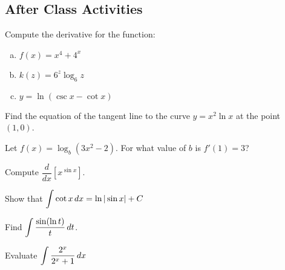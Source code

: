 \documentclass[notes]{subfiles}
\begin{document}
		\begin{pf}
		\end{pf}
		\newpage
		
	\subsection*{After Class Activities}
		\begin{ex}
			Compute the derivative for the function:
			\begin{enumerate}[(a)]
				\item $f(x) =x^4 + 4^x$
					
				\item $k(z) = 6^z\log_6z$
					
				\item $y = \ln (\csc x - \cot x)$
			\end{enumerate}
		\end{ex}
		
		\begin{ex}
			Find the equation of the tangent line to the curve $y = x^2\ln x$ at the point $(1,0)$.
		\end{ex}
			\vs{1}
			
		\begin{ex}
			Let $f(x) = \log_b(3x^2-2)$.  For what value of $b$ is $f'(1) = 3$?
		\end{ex}
			\newpage
		
		\begin{ex}
			Compute $\dfrac{d}{dx}[x^{\sin x}]$.
		\end{ex}	
			
		\begin{ex}
			Show that $\displaystyle \int \cot x\, dx = \ln |\sin x| + C$
		\end{ex}
			
		\begin{ex}
			Find $\displaystyle \int \dfrac{\sin (\ln t)}{t}\, dt$.
		\end{ex}
			
		\begin{ex}
			Evaluate $\displaystyle \int \dfrac{2^x}{2^x + 1}\, dx$
		\end{ex}
\clearpage
\end{document}

